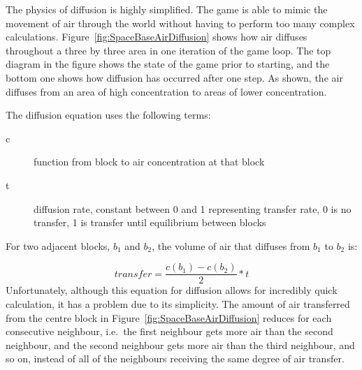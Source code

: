 The physics of diffusion is highly simplified. The game is able to mimic the movement of air through the world without having to perform too many complex calculations. Figure~\ref{fig:SpaceBaseAirDiffusion} shows how air diffuses throughout a three by three area in one iteration of the game loop. The top diagram in the figure shows the state of the game prior to starting, and the bottom one shows how diffusion has occurred after one step. As shown, the air diffuses from an area of high concentration to areas of lower concentration.

The diffusion equation uses the following terms:
\begin{description}
\item[c] function from block to air concentration at that block
\item[t] diffusion rate, constant between 0 and 1 representing transfer rate, 0 is no transfer, 1 is transfer until equilibrium between blocks
\end{description}

For two adjacent blocks, $b_1$ and $b_2$, the volume of air that diffuses from $b_1$ to $b_2$ is:

$$ transfer = \frac{c(b_1) - c(b_2)}{2} * t $$
\noindent
Unfortunately, although this equation for diffusion allows for incredibly quick calculation, it has a problem due to its simplicity. The amount of air transferred from the centre block in Figure~\ref{fig:SpaceBaseAirDiffusion} reduces for each consecutive neighbour, i.e.\ the first neighbour gets more air than the second neighbour, and the second neighbour gets more air than the third neighbour, and so on, instead of all of the neighbours receiving the same degree of air transfer.


